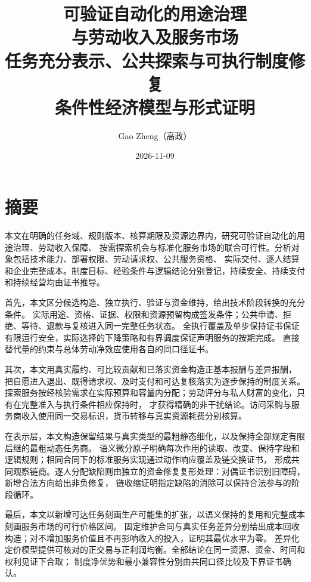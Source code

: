 \documentclass[UTF8,12pt,a4paper,openany,fontset=none,zihao=false]{ctexrep}
\theoremstyle{definition}
\newcommand{\1}{\mathbf 1}
\begin{document}
\title{可验证自动化的用途治理\\与劳动收入及服务市场\\
\large 任务充分表示、公共探索与可执行制度修复\\
\large 条件性经济模型与形式证明}
\author{Gao Zheng（高政）}
\date{2026-11-09}
\maketitle
\setcounter{page}{2}

\chapter*{摘要}

本文在明确的任务域、规则版本、核算期限及资源边界内，研究可验证自动化的用途治理、劳动收入保障、
按需探索机会与标准化服务市场的联合可行性。分析对象包括技术能力、部署权限、劳动请求权、公共服务资格、
实际交付、逐人结算和企业完整成本。制度目标、经验条件与逻辑结论分别登记，持续安全、持续支付和持续经营均由证书推导。

首先，本文区分候选构造、独立执行、验证与资金维持，给出技术阶段转换的充分条件。
实际用途、资格、证据、权限和资源预留构成签发条件；公共申请、拒绝、等待、退款与复核进入同一完整任务状态。
全执行覆盖及单步保持证书保证有限运行安全，实际选择的下降策略和有界调度保证声明服务的按期完成。
直接替代量的约束与总体劳动净效应使用各自的同口径证书。

其次，本文用真实履约、可比较贡献和已落实资金构造正基本报酬与差异报酬，
把自愿进入退出、既得请求权、及时支付和可达复核落实为逐步保持的制度关系。
探索服务按经核验需求在实际预算和容量内分配；劳动评分与私人财富的变化，只有在完整准入与执行条件相应保持时，
才获得精确的非干扰结论。访问采购与服务商收入使用同一交易标识，货币转移与真实资源耗费分别核算。

在表示层，本文构造保留结果与真实类型的最粗静态细化，以及保持全部规定有限后继的最粗动态任务商。
语义微分原子明确每次作用的读取、改变、保持字段和逻辑规则；相同合同下的标准服务实现通过动作响应覆盖及链交换证书，
形成共同观察链商。逐人分配缺陷则由独立的资金修复复形处理：对偶证书识别旧障碍，新增合法方向给出非负修复，
链收缩证明指定缺陷的消除可以保持合法参与的阶段循环。

最后，本文以新增可达任务刻画生产可能集的扩张，以语义保持的复用和完整成本刻画服务市场的可行价格区间。
固定维护合同与真实任务差异分别给出成本回收构造；对不增加服务价值且不再影响收入的投入，证明其最优水平为零。
差异化定价模型提供可核对的正交易与正利润均衡。全部结论在同一资源、资金、时间和权利见证下合取；
制度净优势和最小兼容性分别由共同口径比较及下界证书确认。
\end{document}
